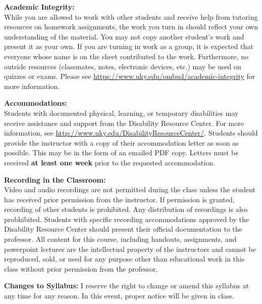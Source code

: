 \documentclass[12pt]{article}
\newcommand{\tbf}[1]{\noindent\textbf{#1}}
\begin{document}
\vspace{0.5cm}

\tbf{Academic Integrity:}\\
While you are allowed to work with other students and receive help from tutoring resources on homework assignments, the work you turn in should reflect your own understanding of the material. You may not copy another student's work and present it as your own. If you are turning in work as a group, it is expected that everyone whose name is on the sheet contributed to the work. Furthermore, no outside resources (classmates, notes, electronic devices, etc.) may be used on quizzes or exams. Please see \url{https://www.uky.edu/ombud/academic-integrity} for more information.   


\vspace{0.5cm}

\tbf{Accommodations:}\\
Students with documented physical, learning, or temporary disabilities may receive assistance and support from the Disability Resource Center. For more information, see \url{http://www.uky.edu/DisabilityResourceCenter/}. Students should provide the instructor with a copy of their accommodation letter as soon as possible. This may be in the form of an emailed PDF copy. Letters must be received \tbf{at least one week} prior to the requested accommodation. 

\vspace{0.5cm}


\tbf{Recording in the Classroom:}\\
Video and audio recordings are not permitted during the class unless the student has received prior permission from the instructor. If permission is granted, recording of other students is prohibited. Any distribution of recordings is also probhibited. Students with specific recording accommodations approved by the Disability Resource Center should present their official documentation to the professor. All content for this course, including handouts, assignments, and powerpoint lectures are the intellectual property of the instructors and cannot be reproduced, sold, or used for any purpose other than educational work in this class without prior permission from the professor.

 
\vspace{0.5cm}
\tbf{Changes to Syllabus:} I reserve the right to change or amend this syllabus at any time for any reason. In this event, proper notice will be given in class. 
 
\end{document}
